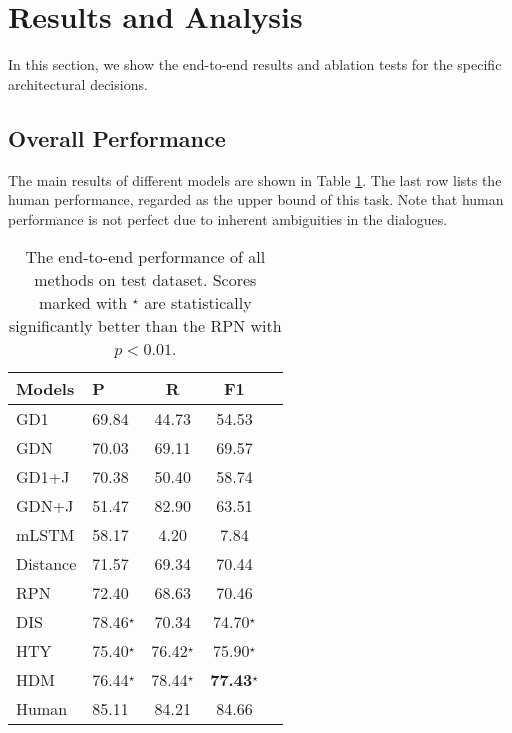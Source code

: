 \section{Results and Analysis}
\label{sec:results}
In this section, we show the end-to-end results and ablation tests for the specific architectural decisions.
\subsection{Overall Performance}
The main results of different models are shown in Table \ref{tab:mainResults}. The last row lists the human performance, regarded as the upper bound of this task. Note that
human performance is not perfect due to inherent ambiguities in the dialogues. 

\begin{table}

	\centering
	\begin{tabular}{p{1cm}<{\centering}p{1cm}<{\centering}ccc}
		\toprule[1.5pt]
		Models &P&R& F1\\
		\midrule[1pt]
		GD1&69.84&44.73&54.53\\
		GDN  &70.03&69.11&69.57\\
		GD1+J&70.38&50.40&58.74\\
		GDN+J&51.47&82.90&63.51\\
		\hline
		mLSTM&58.17&4.20&7.84\\
		Distance&71.57&69.34&70.44\\
		RPN&72.40&68.63&70.46\\
\hline
		DIS&78.46$^\star$&70.34&74.70$^\star$\\
		HTY&75.40$^\star$&76.42$^\star$&75.90$^\star$\\
		HDM&76.44$^\star$&78.44$^\star$&\textbf{77.43}$^\star$\\
		\hline
		Human &85.11&84.21&84.66\\
		\bottomrule[1.5pt]
	\end{tabular}
	\vspace{-0.25cm}
	\caption{The end-to-end performance of all methods on test dataset. 
Scores marked with $^\star$ are statistically significantly better than the RPN 
with $p<0.01$.} 
	\label{tab:mainResults}
\end{table}

 


